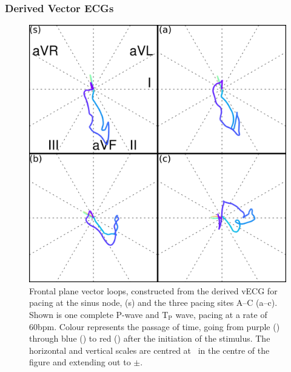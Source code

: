 \subsubsection{Derived Vector ECGs}

\begin{figure}
\begin{center}
\includegraphics{figures/forward/inverted_p_wave/frontal_vector_loops}
\end{center}
\caption[Frontal plane vector loops from pacing sites along the CT]{
\label{fig:forward:inverse:vec_front}
Frontal plane vector loops, constructed from the derived vECG for pacing at the
sinus node, (s) and the three pacing sites A--C (a--c).
Shown is one complete P-wave and $\text{T}_{\text{P}}$ wave, pacing at a rate of
\unit{60}{bpm}.
Colour represents the passage of time, going from purple () through blue
() to red () after the initiation of the stimulus.
The horizontal and vertical scales are centred at \ in the centre of the
figure and extending out to $\pm$.}
\end{figure}

